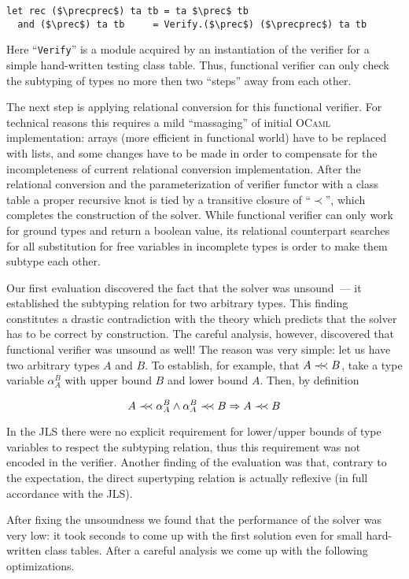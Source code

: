 \begin{lstlisting}[language=ocanren,mathescape=true]
  let rec ($\precprec$) ta tb = ta $\prec$ tb 
  and ($\prec$) ta tb     = Verify.($\prec$) ($\precprec$) ta tb
\end{lstlisting}

Here ``\lstinline|Verify|'' is a module acquired by an instantiation of the verifier for a simple hand-written testing class table.
Thus, functional verifier can only check the subtyping of types no more then two ``steps'' away from each other.

The next step is applying relational conversion for this functional verifier. For technical reasons this requires a mild
``massaging'' of initial \textsc{OCaml} implementation: arrays (more efficient in functional world) have to be replaced
with lists, and some changes have to be made in order to compensate for the incompleteness of current relational
conversion implementation.
After the relational conversion and the parameterization of verifier functor with a class table a proper recursive knot is tied by a transitive closure of ``$\prec$'', which
completes the construction of the solver. While functional verifier can only work for ground types and return a boolean value, its relational counterpart
searches for all substitution for free variables in incomplete types is order to make them subtype each other.

Our first evaluation discovered the fact that the solver was unsound~--- it established the subtyping relation for two arbitrary types. This finding constitutes a drastic
contradiction with the theory which predicts that the solver has to be correct by construction. The careful analysis, however, discovered that functional
verifier was unsound as well! The reason was very simple: let us have two arbitrary types $A$ and $B$. To establish, for example, that $A \prec\mathrel{\mkern-5mu}\prec B$, take a
type variable $\alpha^B_A$ with upper bound $B$ and lower bound $A$. Then, by definition

\[
A\prec\mathrel{\mkern-5mu}\prec \alpha^B_A \wedge \alpha^B_A\prec\mathrel{\mkern-5mu}\prec B \Rightarrow A\prec\mathrel{\mkern-5mu}\prec B
\]

In the JLS there were no explicit requirement for lower/upper bounds of type variables to respect the subtyping relation, thus this requirement was not
encoded in the verifier. Another finding of the evaluation was that, contrary to the expectation, the direct supertyping relation is actually
reflexive (in full accordance with the JLS).

After fixing the unsoundness we found that the performance of the solver was very low: it took seconds to come up with the first solution even for
small hard-written class tables. After a careful analysis we come up with the following optimizations.

